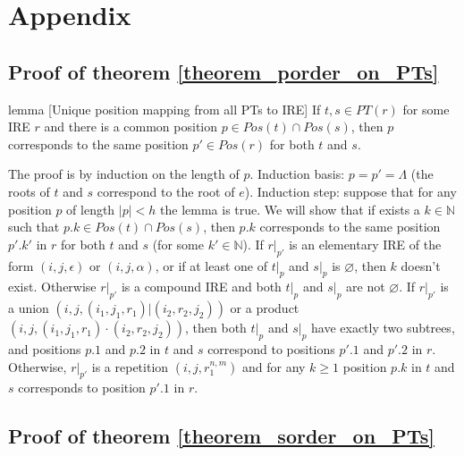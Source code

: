 \documentclass[AMA,STIX1COL]{WileyNJD-v2}
\newcommand{\YN}{\mathbb{N}}
\begin{document}
\vfill\null
\clearpage


\section*{Appendix}

\subsection*{Proof of theorem \ref{theorem_porder_on_PTs}}

\begin{theoremEnd}{lemma}
[Unique position mapping from all PTs to IRE]
    \label{lemma_positions}
    If $t, s \in PT(r)$ for some IRE $r$
    and there is a common position $p \in Pos(t) \cap Pos(s)$,
    then $p$ corresponds to the same position $p' \in Pos(r)$ for both $t$ and $s$.
\end{theoremEnd}
\begin{proofEnd}
    The proof is by induction on the length of $p$.
    Induction basis: $p = p' = \Lambda$ (the roots of $t$ and $s$ correspond to the root of $e$).
    Induction step: suppose that for any position $p$ of length $|p| < h$ the lemma is true.
    We will show that if exists a $k \in \YN$ such that $p.k \in Pos(t) \cap Pos(s)$,
    then $p.k$ corresponds to the same position $p'.k'$ in $r$ for both $t$ and $s$ (for some $k' \in \YN$).
    If $r|_{p'}$ is an elementary IRE of the form $(i, j, \epsilon)$ or $(i, j, \alpha)$,
    or if at least one of $t|_p$ and $s|_p$ is $\varnothing$,
    then $k$ doesn't exist.
    Otherwise $r|_{p'}$ is a compound IRE and both $t|_p$ and $s|_p$ are not $\varnothing$.
    If $r|_{p'}$ is a union $(i, j, (i_1, j_1, r_1)|(i_2, r_2, j_2))$
    or a product $(i, j, (i_1, j_1, r_1)\cdot(i_2, r_2, j_2))$,
    then both $t|_p$ and $s|_p$ have exactly two subtrees,
    and positions $p.1$ and $p.2$ in $t$ and $s$ correspond to positions $p'.1$ and $p'.2$ in $r$.
    Otherwise, $r|_{p'}$ is a repetition $(i, j, r_1^{n,m})$
    and for any $k \geq 1$ position $p.k$ in $t$ and $s$ corresponds to position $p'.1$ in $r$.
\end{proofEnd}



\subsection*{Proof of theorem \ref{theorem_sorder_on_PTs}}
\end{document}

